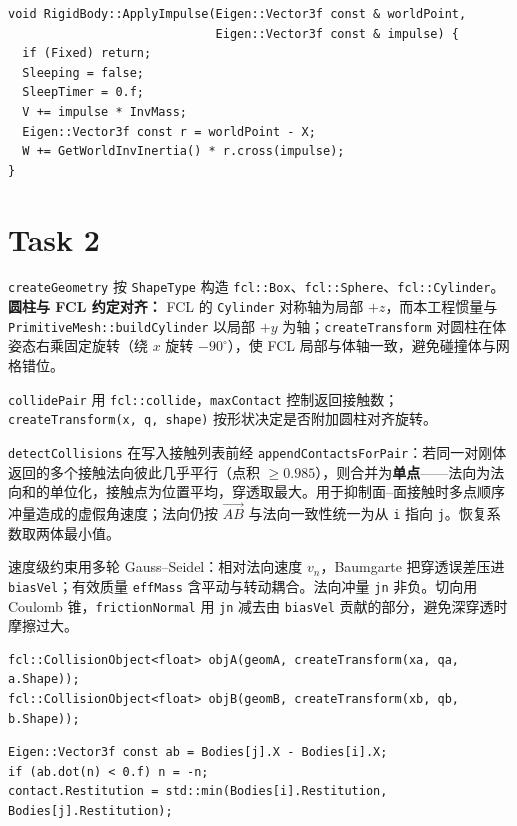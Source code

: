 \documentclass[UTF8,a4paper,11pt]{ctexart}
\begin{document}
\begin{lstlisting}
void RigidBody::ApplyImpulse(Eigen::Vector3f const & worldPoint,
                             Eigen::Vector3f const & impulse) {
  if (Fixed) return;
  Sleeping = false;
  SleepTimer = 0.f;
  V += impulse * InvMass;
  Eigen::Vector3f const r = worldPoint - X;
  W += GetWorldInvInertia() * r.cross(impulse);
}
\end{lstlisting}

\section{Task 2}
\texttt{createGeometry} 按 \texttt{ShapeType} 构造 \texttt{fcl::Box}、\texttt{fcl::Sphere}、\texttt{fcl::Cylinder}。\textbf{圆柱与 FCL 约定对齐：} FCL 的 \texttt{Cylinder} 对称轴为局部 $+z$，而本工程惯量与 \texttt{PrimitiveMesh::buildCylinder} 以局部 $+y$ 为轴；\texttt{createTransform} 对圆柱在体姿态右乘固定旋转（绕 $x$ 旋转 $-90^\circ$），使 FCL 局部与体轴一致，避免碰撞体与网格错位。

\texttt{collidePair} 用 \texttt{fcl::collide}，\texttt{maxContact} 控制返回接触数；\texttt{createTransform(x, q, shape)} 按形状决定是否附加圆柱对齐旋转。

\texttt{detectCollisions} 在写入接触列表前经 \texttt{appendContactsForPair}：若同一对刚体返回的多个接触法向彼此几乎平行（点积 $\ge 0.985$），则合并为\textbf{单点}——法向为法向和的单位化，接触点为位置平均，穿透取最大。用于抑制面--面接触时多点顺序冲量造成的虚假角速度；法向仍按 $\overrightarrow{AB}$ 与法向一致性统一为从 \texttt{i} 指向 \texttt{j}。恢复系数取两体最小值。

速度级约束用多轮 Gauss--Seidel：相对法向速度 $v_n$，Baumgarte 把穿透误差压进 \texttt{biasVel}；有效质量 \texttt{effMass} 含平动与转动耦合。法向冲量 \texttt{jn} 非负。切向用 Coulomb 锥，\texttt{frictionNormal} 用 \texttt{jn} 减去由 \texttt{biasVel} 贡献的部分，避免深穿透时摩擦过大。

\begin{lstlisting}
fcl::CollisionObject<float> objA(geomA, createTransform(xa, qa, a.Shape));
fcl::CollisionObject<float> objB(geomB, createTransform(xb, qb, b.Shape));
\end{lstlisting}

\begin{lstlisting}
Eigen::Vector3f const ab = Bodies[j].X - Bodies[i].X;
if (ab.dot(n) < 0.f) n = -n;
contact.Restitution = std::min(Bodies[i].Restitution, Bodies[j].Restitution);
\end{lstlisting}
\end{document}
